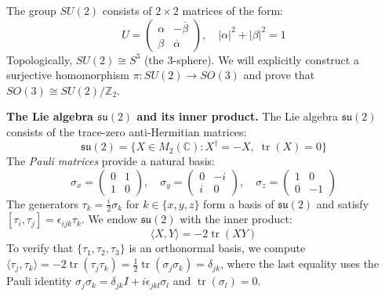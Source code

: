 \begin{example}\label{ex:su2_so3}
The group $SU(2)$ consists of $2 \times 2$ matrices of the form:
\begin{equation}
U = \begin{pmatrix}
\alpha & -\overline{\beta} \\
\beta & \overline{\alpha}
\end{pmatrix}, \quad |\alpha|^2 + |\beta|^2 = 1
\end{equation}
Topologically, $SU(2) \cong S^3$ (the 3-sphere). We will explicitly construct a surjective homomorphism $\pi: SU(2) \to SO(3)$ and prove that $SO(3) \cong SU(2)/\mathbb{Z}_2$.

\textbf{The Lie algebra $\mathfrak{su}(2)$ and its inner product.}
The Lie algebra $\mathfrak{su}(2)$ consists of the trace-zero anti-Hermitian matrices:
\[
	\mathfrak{su}(2) = \{X \in M_2(\mathbb{C}) : X^\dagger = -X, \; \operatorname{tr}(X) = 0\}
\]
The \textit{Pauli matrices} provide a natural basis:
\begin{equation}
\sigma_x = \begin{pmatrix}
0 & 1 \\
1 & 0
\end{pmatrix}, \quad
\sigma_y = \begin{pmatrix}
0 & -i \\
i & 0
\end{pmatrix}, \quad
\sigma_z = \begin{pmatrix}
1 & 0 \\
0 & -1
\end{pmatrix}
\end{equation}
The generators $\tau_k = \frac{i}{2}\sigma_k$ for $k \in \{x, y, z\}$ form a basis of $\mathfrak{su}(2)$ and satisfy $[\tau_i, \tau_j] = \epsilon_{ijk}\tau_k$. We endow $\mathfrak{su}(2)$ with the inner product:
\begin{equation}\label{eq:inner_product_su2}
	\langle X, Y \rangle = -2\operatorname{tr}(XY)
\end{equation}
To verify that $\{\tau_1, \tau_2, \tau_3\}$ is an orthonormal basis, we compute $\langle \tau_j, \tau_k \rangle = -2\operatorname{tr}(\tau_j \tau_k) = \frac{1}{2}\operatorname{tr}(\sigma_j \sigma_k) = \delta_{jk}$, where the last equality uses the Pauli identity $\sigma_j \sigma_k = \delta_{jk} I + i\epsilon_{jkl}\sigma_l$ and $\operatorname{tr}(\sigma_l) = 0$.


\end{example}
